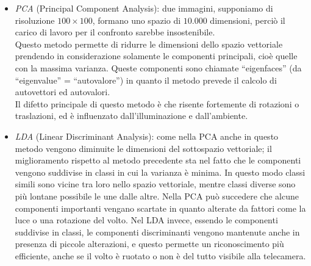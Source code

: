 \begin{itemize}
\item \textit{PCA} (Principal Component Analysis): due immagini, supponiamo di risoluzione $100\times100$, formano uno spazio di $10.000$ dimensioni, perciò il carico di lavoro per il confronto sarebbe insostenibile.\\
Questo metodo permette di ridurre le dimensioni dello spazio vettoriale prendendo in considerazione solamente le componenti principali, cioè quelle con la massima varianza.
Queste componenti sono chiamate “eigenfaces” (da “eigenvalue” = “autovalore”) in quanto il metodo prevede il calcolo di autovettori ed autovalori.\\
Il difetto principale di questo metodo è che risente fortemente di rotazioni o traslazioni, ed è influenzato dall'illuminazione e dall'ambiente.

\item \textit{LDA} (Linear Discriminant Analysis): come nella PCA anche in questo metodo vengono diminuite le dimensioni del sottospazio vettoriale; il miglioramento rispetto al metodo precedente sta nel fatto che le componenti vengono suddivise in classi in cui la varianza è minima. In questo modo classi simili sono vicine tra loro nello spazio vettoriale, mentre classi diverse sono più lontane possibile le une dalle altre. Nella PCA può succedere che alcune componenti importanti vengano scartate in quanto alterate da fattori come la luce o una rotazione del volto. Nel LDA invece, essendo le componenti suddivise in classi, le componenti discriminanti vengono mantenute anche in presenza di piccole alterazioni, e questo permette un riconoscimento più efficiente, anche se il volto è ruotato o non è del tutto visibile alla telecamera.


\end{itemize}
